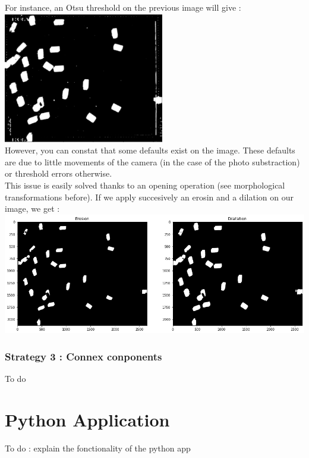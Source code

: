 \documentclass{article}
\begin{document}
For instance, an Otsu threshold on the previous image will give :\\
\includegraphics[width=7cm]{images/img24.png}\\

However, you can constat that some defaults exist on the image. These defaults are due to little movements of the camera (in the case of the photo substraction) or threshold errors otherwise.\\

This issue is easily solved thanks to an opening operation (see morphological transformations before).
If we apply succesively an erosin and a dilation on our image, we get :\\
\includegraphics[width=14cm]{images/img25.png}\\ 


\subsubsection{Strategy 3 : Connex conponents}

To do

\section{Python Application}

To do : explain the fonctionality of the python app
\end{document}
